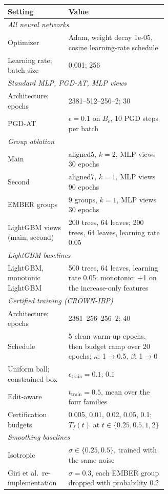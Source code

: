 \begin{tabular}{lp{0.62\linewidth}}
\toprule
Setting & Value \\
\midrule
\multicolumn{2}{l}{\emph{All neural networks}} \\
Optimizer & Adam, weight decay 1e-05, cosine learning-rate schedule \\
Learning rate; batch size & 0.001; 256 \\
\midrule\multicolumn{2}{l}{\emph{Standard MLP, PGD-AT, MLP views}} \\
Architecture; epochs & 2381--512--256--2; 30 \\
PGD-AT & $\epsilon=0.1$ on $B_\epsilon$, 10 PGD steps per batch \\
\midrule\multicolumn{2}{l}{\emph{Group ablation}} \\
Main & aligned5, $k=2$, MLP views 30 epochs \\
Second & aligned7, $k=1$, MLP views 90 epochs \\
EMBER groups & 9 groups, $k=1$, MLP views 30 epochs \\
LightGBM views (main; second) & 200 trees, 64 leaves; 200 trees, 64 leaves, learning rate 0.05 \\
\midrule\multicolumn{2}{l}{\emph{LightGBM baselines}} \\
LightGBM, monotonic LightGBM & 500 trees, 64 leaves, learning rate 0.05; monotonic: +1 on the increase-only features \\
\midrule\multicolumn{2}{l}{\emph{Certified training (CROWN-IBP)}} \\
Architecture; epochs & 2381--256--256--2; 40 \\
Schedule & 5 clean warm-up epochs, then budget ramp over 20 epochs; $\kappa$: 1$\to$0.5, $\beta$: 1$\to$0 \\
Uniform ball; constrained box & $\epsilon_{\text{train}}=0.1$; $0.1$ \\
Edit-aware & $t_{\text{train}}=0.5$, mean over the four families \\
Certification budgets & 0.005, 0.01, 0.02, 0.05, 0.1; $T_f(t)$ at $t\in\{0.25, 0.5, 1, 2\}$ \\
\midrule\multicolumn{2}{l}{\emph{Smoothing baselines}} \\
Isotropic & $\sigma\in\{0.25, 0.5\}$, trained with the same noise \\
Giri et al.\ re-implementation & $\sigma=0.3$, each EMBER group dropped with probability 0.2 \\
\bottomrule
\end{tabular}
